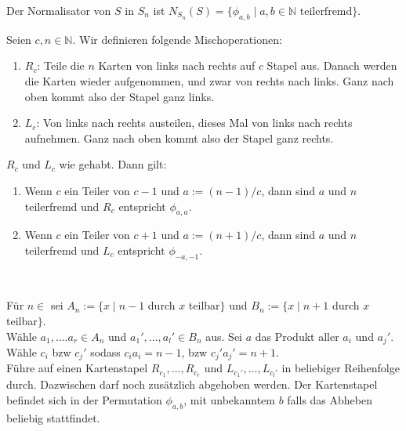 \documentclass[a4paper]{article}
\newcommand{\N}{\mathbb{N}}
\begin{document}
    \begin{satz}[4.5]
            Der Normalisator von $S$ in $S_n$ ist $N_{S_n}(S) = \{\phi_{a, b}  \mid a, b \in \N \text{ teilerfremd}\}$.
       
    \end{satz}
    \begin{bemerkung}[5.1] 
    Seien $c,n \in \mathbb{N}$. Wir definieren folgende Mischoperationen: 
    \begin{enumerate}
     \item $R_c$: Teile die $n$ Karten von links nach rechts auf $c$ Stapel aus. Danach werden die Karten wieder aufgenommen, und zwar von rechts nach links. Ganz nach oben kommt also der Stapel ganz links.
    \item $L_c$: Von links nach rechts austeilen, dieses Mal von links nach rechts aufnehmen.  Ganz nach oben kommt also der Stapel ganz rechts.
    \end{enumerate}
    \end{bemerkung}   
    
    \begin{satz}[5.2]
    $R_c$ und $L_c$ wie gehabt. Dann gilt:
    \begin{enumerate}
    \item Wenn $c$ ein Teiler von $c - 1$ und $a := (n - 1)/c$, dann sind $a$ und $n$ teilerfremd und $R_c$ entspricht $\phi_{a,a}$.
    \item Wenn $c$ ein Teiler von $c + 1$ und $a := (n + 1)/c$, dann sind $a$ und $n$ teilerfremd und $L_c$ entspricht $\phi_{-a,-1}$.
    \end{enumerate}
    \end{satz} \\
    
    \begin{lemma}[5.3]
    Für $n \in $  sei $A_n := \lbrace x  \mid  n-1$ durch $x$ teilbar$\rbrace$ und $B_n := \lbrace x  \mid  n+1$ durch $x$ teilbar$\rbrace$. \\
    Wähle $a_1, …. a_r \in A_n$ und $a_1', …, a_l' \in B_n$ aus. Sei $a$ das Produkt aller $a_i$ und $a_j'$. Wähle $c_i$ bzw $c_j'$ sodass $c_ia_i = n-1$, bzw $c_j'a_j' = n+1$. \\
    Führe auf einen Kartenstapel $R_{c_1}, …, R_{c_r}$ und $L_{c_1'}, …, L_{c_l'}$ in beliebiger Reihenfolge durch. Dazwischen darf noch zusätzlich abgehoben werden. Der Kartenstapel befindet sich in der Permutation $\phi_{a,b}$, mit unbekanntem $b$ falls das Abheben beliebig stattfindet.
    \end{lemma}
\end{document}
